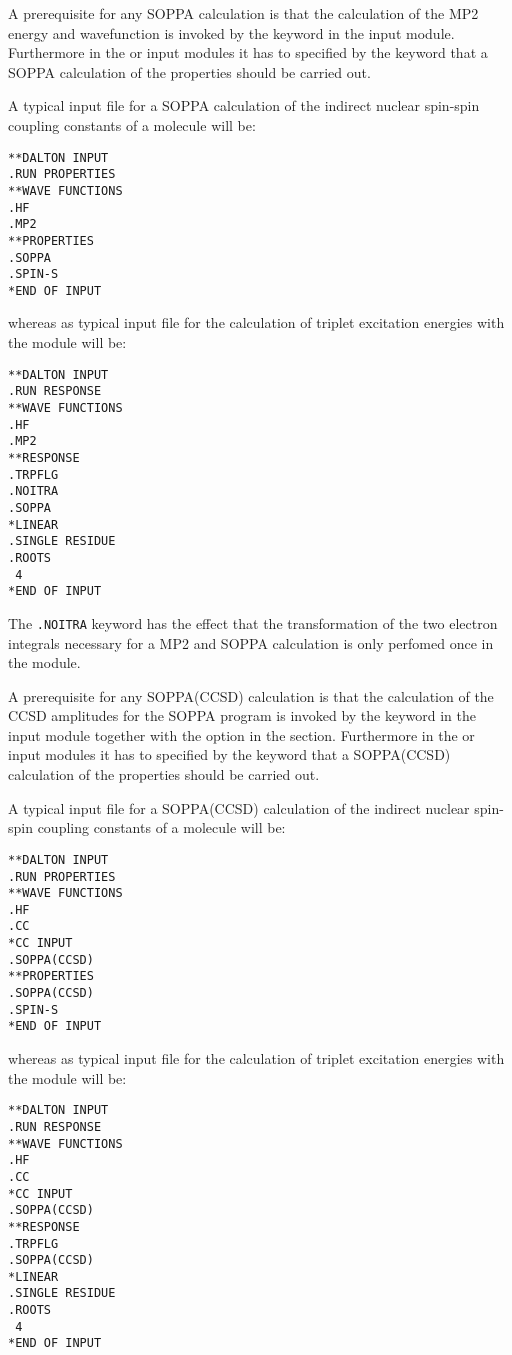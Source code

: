 A prerequisite for any SOPPA calculation is that the calculation of
the MP2 energy and wavefunction is invoked by the keyword  in
the  input module. Furthermore in the
 or  input modules it has to specified 
by the keyword  that a SOPPA calculation of the properties
should be carried out.

A typical input file for a SOPPA calculation of the indirect nuclear
spin-spin coupling constants of a molecule will be:

\begin{verbatim}
**DALTON INPUT
.RUN PROPERTIES
**WAVE FUNCTIONS
.HF
.MP2
**PROPERTIES
.SOPPA
.SPIN-S
*END OF INPUT
\end{verbatim}

whereas as typical input file for the calculation of triplet
excitation energies with the
 module will be: 
\begin{verbatim}
**DALTON INPUT
.RUN RESPONSE
**WAVE FUNCTIONS
.HF
.MP2
**RESPONSE
.TRPFLG
.NOITRA
.SOPPA
*LINEAR
.SINGLE RESIDUE
.ROOTS
 4
*END OF INPUT
\end{verbatim}
The {\tt .NOITRA} keyword has the effect that the transformation of the two 
electron integrals necessary for a MP2 and SOPPA calculation is only perfomed
once in the  module.

A prerequisite for any SOPPA(CCSD) calculation is that the calculation of
the CCSD amplitudes for the SOPPA program is invoked by the keyword 
in the  input module together with the 
option in the  section. Furthermore in the  or
 input modules it has to specified by the keyword 
that a SOPPA(CCSD) calculation of the properties should be carried out. 

A typical input file for a SOPPA(CCSD) calculation of the indirect nuclear
spin-spin coupling constants of a molecule will be:

\begin{verbatim}
**DALTON INPUT
.RUN PROPERTIES
**WAVE FUNCTIONS
.HF
.CC
*CC INPUT
.SOPPA(CCSD)
**PROPERTIES
.SOPPA(CCSD)
.SPIN-S
*END OF INPUT
\end{verbatim}

whereas as typical input file for the calculation of triplet
excitation energies with the
 module will be: 
\begin{verbatim}
**DALTON INPUT
.RUN RESPONSE
**WAVE FUNCTIONS
.HF
.CC
*CC INPUT
.SOPPA(CCSD)
**RESPONSE
.TRPFLG
.SOPPA(CCSD)
*LINEAR
.SINGLE RESIDUE
.ROOTS
 4
*END OF INPUT
\end{verbatim}


